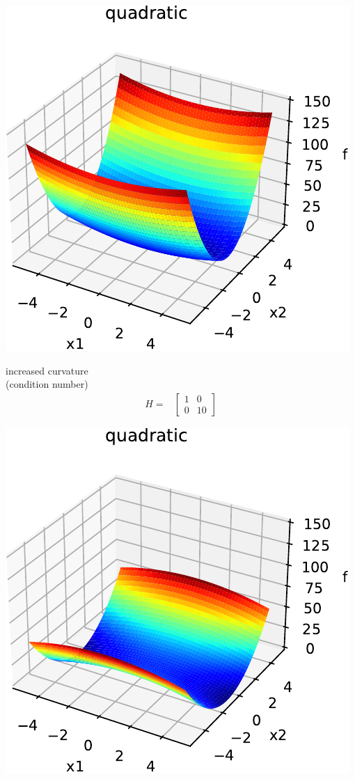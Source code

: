 \documentclass[12pt]{beamer}
\begin{document}
\begin{frame}[allowframebreaks]
\begin{minipage}{0.5\textwidth}
\includegraphics[width=\textwidth]{quad_rot0_cond10_H_1_0_0_10-crop.pdf}
\end{minipage}
\begin{minipage}{0.4\textwidth}
increased curvature \\ 
(condition number)
\begin{align*}
H =& \begin{bmatrix} 1 & 0 \\ 0 & 10\end{bmatrix}  
\end{align*}
\end{minipage}
\newpage
\begin{minipage}{0.5\textwidth}
\includegraphics[width=\textwidth]{quad_rot0_condm5_H_m1_0_0_5-crop.pdf}

\end{minipage}
\end{frame}
\end{document}
